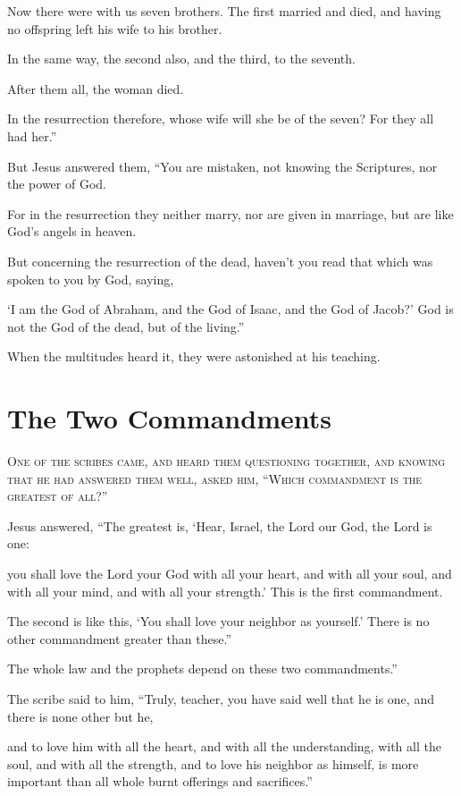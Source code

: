 Now there were with us seven brothers. The first married and died, and having no offspring left his wife to his brother.

In the same way, the second also, and the third, to the seventh.

After them all, the woman died.

In the resurrection therefore, whose wife will she be of the seven? For they all had her.”

But Jesus answered them, “You are mistaken, not knowing the Scriptures, nor the power of God.

For in the resurrection they neither marry, nor are given in marriage, but are like God’s angels in heaven.

But concerning the resurrection of the dead, haven’t you read that which was spoken to you by God, saying,

‘I am the God of Abraham, and the God of Isaac, and the God of Jacob?’ God is not the God of the dead, but of the living.”

When the multitudes heard it, they were astonished at his teaching.


\clearpage \section*{The Two Commandments}

\lettrine{O}{ne of the scribes came, and heard them questioning together, and knowing that he had answered them well, asked him, “Which commandment is the greatest of all?”}

Jesus answered, “The greatest is, ‘Hear, Israel, the Lord our God, the Lord is one:

you shall love the Lord your God with all your heart, and with all your soul, and with all your mind, and with all your strength.’ This is the first commandment.

The second is like this, ‘You shall love your neighbor as yourself.’ There is no other commandment greater than these.”

The whole law and the prophets depend on these two commandments.”

The scribe said to him, “Truly, teacher, you have said well that he is one, and there is none other but he,

and to love him with all the heart, and with all the understanding, with all the soul, and with all the strength, and to love his neighbor as himself, is more important than all whole burnt offerings and sacrifices.”


